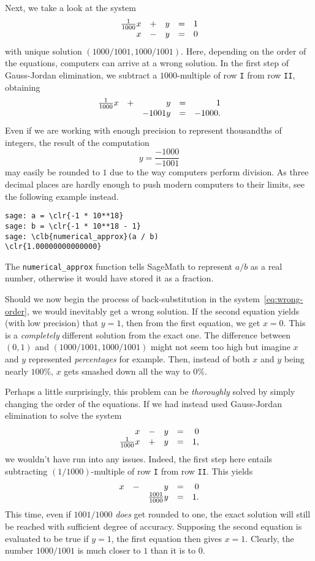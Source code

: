 Next, we take a look at the system
\[
 \begin{array}{r c r c r}
  \frac{1}{1000}x & + & y & = & 1\\
  x & - & y & = & 0
 \end{array}
\]
with unique solution $(1000 / 1001, 1000 / 1001)$. Here, depending on the order
of the equations, computers can arrive at a wrong solution. In the first step of
Gauss-Jordan elimination, we subtract a $1000$-multiple of row \texttt{I} from
row \texttt{II}, obtaining
\begin{equation}
 \label{eq:wrong-order}
 \begin{array}{r c r c r}
  \frac{1}{1000}x & + & y & = & 1\\
  & & -1001 y & = & -1000.
 \end{array}
\end{equation}
Even if we are working with enough precision to represent thousandths of
integers, the result of the computation
\[
 y = \frac{-1000}{-1001}
\]
may easily be rounded to $1$ due to the way computers perform division. As three
decimal places are hardly enough to push modern computers to their limits, see
the following example instead.
\begin{Verbatim}
sage: a = \clr{-1 * 10**18}
sage: b = \clr{-1 * 10**18 - 1}
sage: \clb{numerical_approx}(a / b)
\clr{1.00000000000000}
\end{Verbatim}
The \texttt{numerical\_approx} function tells SageMath to represent $a / b$ as a
real number, otherwise it would have stored it as a fraction.

Should we now begin the process of back-substitution in the
system~\eqref{eq:wrong-order}, we would inevitably get a wrong solution. If the
second equation yields (with low precision) that $y = 1$, then from the first
equation, we get $x = 0$. This is a \emph{completely} different solution from
the exact one. The difference between $(0,1)$ and $(1000 / 1001, 1000 / 1001)$
might not seem too high but imagine $x$ and $y$ represented \emph{percentages}
for example. Then, instead of both $x$ and $y$ being nearly $100\%$, $x$ gets
smashed down all the way to $0 \%$.

Perhaps a little surprisingly, this problem can be \emph{thoroughly} solved by
simply changing the order of the equations. If we had instead used Gauss-Jordan
elimination to solve the system
\[
 \begin{array}{r c r c r}
  x & - & y & = & 0\\
  \frac{1}{1000}x & + & y & = & 1,
 \end{array}
\]
we wouldn't have run into any issues. Indeed, the first step here entails
subtracting $(1 / 1000)$-multiple of row \texttt{I} from row \texttt{II}. This
yields
\[
 \begin{array}{r c r c r}
  x & - & y & = & 0\\
  & & \frac{1001}{1000}y & = & 1.
 \end{array}
\]
This time, even if $1001 / 1000$ \emph{does} get rounded to one, the exact
solution will still be reached with sufficient degree of accuracy. Supposing the
second equation is evaluated to be true if $y = 1$, the first equation then
gives $x = 1$. Clearly, the number $1000 / 1001$ is much closer to $1$ than it
is to $0$.

